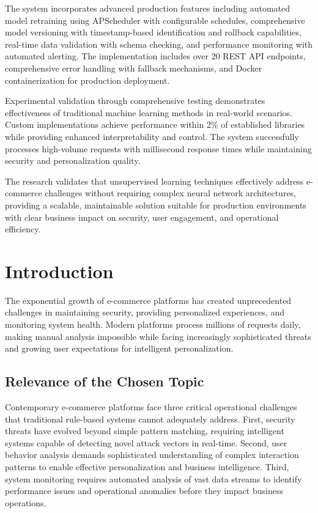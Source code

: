 \documentclass[12pt]{article}
\begin{document}
The system incorporates advanced production features including automated model retraining using APScheduler with configurable schedules, comprehensive model versioning with timestamp-based identification and rollback capabilities, real-time data validation with schema checking, and performance monitoring with automated alerting. The implementation includes over 20 REST API endpoints, comprehensive error handling with fallback mechanisms, and Docker containerization for production deployment.

Experimental validation through comprehensive testing demonstrates effectiveness of traditional machine learning methods in real-world scenarios. Custom implementations achieve performance within 2\% of established libraries while providing enhanced interpretability and control. The system successfully processes high-volume requests with millisecond response times while maintaining security and personalization quality.

The research validates that unsupervised learning techniques effectively address e-commerce challenges without requiring complex neural network architectures, providing a scalable, maintainable solution suitable for production environments with clear business impact on security, user engagement, and operational efficiency.

\newpage

\section{Introduction}
The exponential growth of e-commerce platforms has created unprecedented challenges in maintaining security, providing personalized experiences, and monitoring system health. Modern platforms process millions of requests daily, making manual analysis impossible while facing increasingly sophisticated threats and growing user expectations for intelligent personalization.

\subsection{Relevance of the Chosen Topic}
Contemporary e-commerce platforms face three critical operational challenges that traditional rule-based systems cannot adequately address. First, security threats have evolved beyond simple pattern matching, requiring intelligent systems capable of detecting novel attack vectors in real-time. Second, user behavior analysis demands sophisticated understanding of complex interaction patterns to enable effective personalization and business intelligence. Third, system monitoring requires automated analysis of vast data streams to identify performance issues and operational anomalies before they impact business operations.
\end{document}
